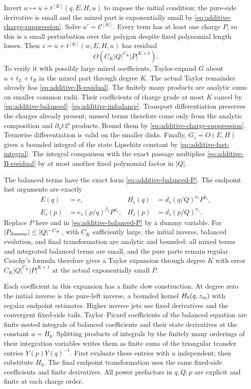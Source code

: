 Invert $u\mapsto u+t^{[K]}(q,E,H,u)$ to impose the initial condition;
the pure-side derivative is small and the mixed part is exponentially
small by \eqref{eq:additive-charge-suppression}.  Solve
$u'=\mathcal C^{[K]}$.  Every term has at least one charge $P$, so
this is a small perturbation over the polygon despite fixed polynomial
length losses.  Then $z=u+t^{[K]}(w,E,H,u)$ has residual
\begin{equation}\label{eq:additive-B-residual}
 O(C_K|Q|^{C_K}|P|^{K+1}).
\end{equation}
To verify it with possibly large mixed coefficients, Taylor-expand $G$
about $u+t_L+t_R$ in the mixed part through degree $K$.  The actual
Taylor remainder already has \eqref{eq:additive-B-residual}.  The
finitely many products are analytic sums on smaller common radii.
Their coefficients of charge grade at most $K$ cancel by
\eqref{eq:additive-balanced}--\eqref{eq:additive-imbalance}.
Transport differentiation preserves the charges already present;
unused terms therefore come only from the analytic composition and
$\partial_ut\,\mathcal C$ products.  Bound them by
\eqref{eq:additive-charge-suppression}.  Termwise differentiation is
valid on the smaller disks.  Finally, $G_z=O(E,H)$ gives a bounded
integral of the state Lipschitz constant by
\eqref{eq:additive-fast-integral}.  The integral comparison with the
exact passage multiplies \eqref{eq:additive-B-residual} by at most
another fixed polynomial factor in $|Q|$.

The balanced terms have the exact form
\eqref{eq:additive-balanced-P}.  The endpoint fast arguments are exactly
\begin{align}
 E(q)&=e,& H_s(q)&=d_s(q/Q)^{\nu_s}P^{b_s},\label{eq:additive-end-fast-q}\\
 E_s(p)&=e_s(p/q)^{\beta_s}P^{a_s},&
 H_s(p)&=d_s(p/Q)^{\nu_s}.\label{eq:additive-end-fast-p}
\end{align}
Replace $P$ here and in \eqref{eq:additive-balanced-P} by a dummy
variable.  For $|P_{\rm dummy}|\le |Q|^{-C_K}$, with $C_K$ sufficiently
large, the initial inverse, balanced evolution, and final transformation
are analytic and bounded: all mixed terms and integrated balanced
terms are small, and the pure parts remain regular.  Cauchy's formula
therefore gives a Taylor expansion through degree $K$ with error
$C_K|Q|^{C_K}|P|^{K+1}$ at the actual exponentially small $P$.

Each coefficient in this expansion has a finite slow construction.
At degree zero the initial inverse is the pure-left inverse,
a bounded kernel $H_0(q,z_{\rm in})$ with regular endpoint estimates.
Higher inverse jets use fixed derivatives and the convergent
fixed-side tails.  Taylor--Picard coefficients of the balanced equation
are finite nested integrals of balanced coefficients and their state
derivatives at the constant $u=H_0$.  Splitting products of integrals
by the finitely many orderings of their integration variables writes
them as finite sums of the triangular transfer entries
$Y(p)Y(q)^{-1}$.  First evaluate these entries with $u$ independent;
then substitute $H_0$.  The final endpoint transformation uses the
same fixed-side coefficients and finite derivatives.  All power
prefactors in $q,Q,p$ are explicit and finite at each charge order.

